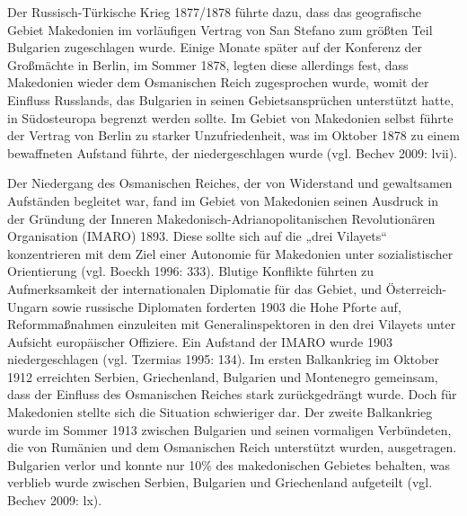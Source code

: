\par
Der Russisch-Türkische Krieg 1877/1878 führte dazu, dass das geografische Gebiet Makedonien im vorläufigen Vertrag von San Stefano zum größten Teil Bulgarien zugeschlagen wurde. Einige Monate später auf der Konferenz der Großmächte in Berlin, im Sommer 1878, legten diese allerdings fest, dass Makedonien wieder dem Osmanischen Reich zugesprochen wurde, womit der Einfluss Russlands, das Bulgarien in seinen Gebietsansprüchen unterstützt hatte, in Südosteuropa begrenzt werden sollte. Im Gebiet von Makedonien selbst führte der Vertrag von Berlin zu starker Unzufriedenheit, was im Oktober 1878 zu einem bewaffneten Aufstand führte, der niedergeschlagen wurde (vgl. Bechev 2009: lvii).\par
Der Niedergang des Osmanischen Reiches, der von Widerstand und gewaltsamen Aufständen begleitet war, fand im Gebiet von Makedonien seinen Ausdruck in der Gründung der Inneren Makedonisch-Adrianopolitanischen Revolutionären Organisation (IMARO) 1893. Diese sollte sich auf die „drei Vilayets“ konzentrieren mit dem Ziel einer Autonomie für Makedonien unter sozialistischer Orientierung (vgl. Boeckh 1996: 333). Blutige Konflikte führten zu Aufmerksamkeit der internationalen Diplomatie für das Gebiet, und Österreich-Ungarn sowie russische Diplomaten forderten 1903 die Hohe Pforte auf, Reformmaßnahmen einzuleiten mit Generalinspektoren in den drei Vilayets unter Aufsicht europäischer Offiziere. Ein Aufstand der IMARO wurde 1903 niedergeschlagen (vgl. Tzermias 1995: 134). Im ersten Balkankrieg im Oktober 1912 erreichten Serbien, Griechenland, Bulgarien und Montenegro gemeinsam, dass der Einfluss des Osmanischen Reiches stark zurückgedrängt wurde. Doch für Makedonien stellte sich die Situation schwieriger dar. Der zweite Balkankrieg wurde im Sommer 1913 zwischen Bulgarien und seinen vormaligen Verbündeten, die von Rumänien und dem Osmanischen Reich unterstützt wurden, ausgetragen. Bulgarien verlor und konnte nur 10\% des makedonischen Gebietes behalten, was verblieb wurde zwischen Serbien, Bulgarien und Griechenland aufgeteilt (vgl. Bechev 2009: lx).\par
 

